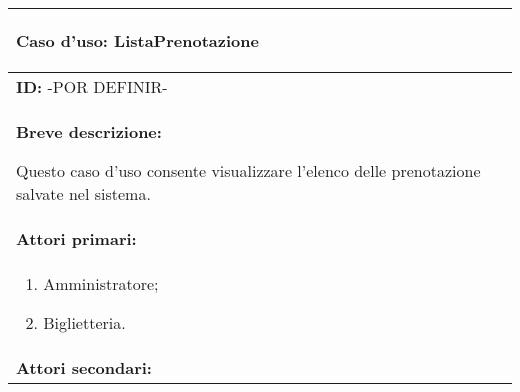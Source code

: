 \documentclass{article}
\begin{document}
\begin{table}[t]
    \centering
    \begin{tabular}{|p{\linewidth}|}
        \hline
        \cellcolor{gray!100}
        \color{white}
        \begin{center}
            \textbf{Caso d'uso:} ListaPrenotazione
        \end{center} \\
        \hline
        \textbf{ID:} -POR DEFINIR- \\
        \hline
        \cellcolor{gray!20}
        \textbf{Breve descrizione:}
        
        Questo caso d'uso consente visualizzare l'elenco delle prenotazione salvate nel sistema. \\
        \hline
        \textbf{Attori primari:} \\
        \begin{minipage}{\linewidth}
            \begin{enumerate}[noitemsep]
                \item Amministratore;
                \item Biglietteria.
            \end{enumerate}
        \end{minipage}
        \vspace {-5pt} \\
        \hline
        \textbf{Attori secondari:}
        

\end{tabular}
\end{table}
\end{document}
